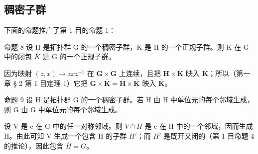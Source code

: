 \subsection{稠密子群}

下面的命题推广了第 1 目的命题 1：

命题 8 设 H 是拓扑群 G 的一个稠密子群，K 是 H 的一个正规子群。则 K 在 G 中的闭包 \(\overline{K}\) 是 G 的一个正规子群。

因为映射 \((z, x) \to zxz^{-1}\) 在 \(\mathbf{G} \times \mathbf{G}\) 上连续，且把 \(\mathbf{H} \times \overline{\mathbf{K}}\) 映入 \(\overline{\mathbf{K}}\)；所以（第一章 § 2 第 1 目定理 1）它把 \(\mathbf{G} \times \overline{\mathbf{K}} = \overline{\mathbf{H}} \times \overline{\mathbf{K}}\) 映入 \(\overline{\mathbf{K}}\)。

命题 9 设 H 是拓扑群 G 的一个稠密子群。若 H 由 H 中单位元的每个邻域生成，则 G 由 G 中单位元的每个邻域生成。

设 V 是 e 在 G 中的任一对称邻域。则 \(V \cap H\) 是 e 在 H 中的一个邻域，因而生成 H。由此可知 V 生成一个包含 H 的子群 \(H'\)；而 \(H'\) 是既开又闭的（第 1 目命题 4 的推论），因此包含 \(\overline{H} = G\)。

